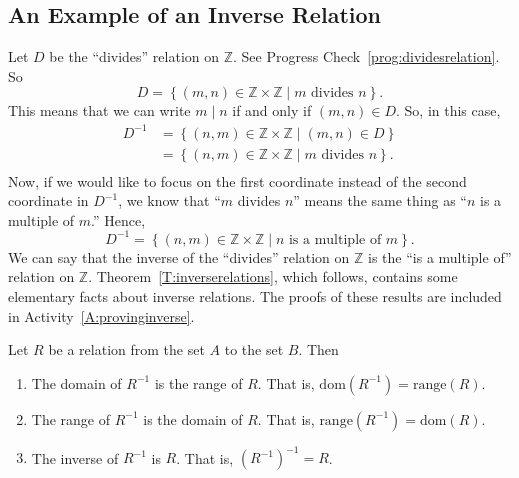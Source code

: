 \subsection*{An Example of an Inverse Relation}
Let $D$ be the ``divides'' relation on  $\mathbb{Z}$.  See Progress 
Check~\ref{prog:dividesrelation}.  So
\[
D = \left\{ { {\left( {m, n} \right) \in \mathbb{Z} \times \mathbb{Z} } \mid m\text{  divides  }n} \right\}\!.
\]
This means that we can write
$m \mid n$ if and only if $\left( {m, n} \right) \in D$.
So, in this case,
\[
\begin{aligned}
D^{ - 1}  &= \left\{ { {\left( {n, m} \right) \in \mathbb{Z} \times \mathbb{Z} } \mid \left( {m, n} \right) \in D} \right\} \\ 
          &= \left\{ { {\left( {n, m} \right) \in \mathbb{Z} \times \mathbb{Z} } \mid m\text{  divides  }n} \right\}\!. \\ 
\end{aligned}
\]
Now, if we would like to focus on the first coordinate instead of the second coordinate in  
$D^{ - 1} $, we know that  ``$m$  divides  $n$''  means the same thing as  ``$n$  is a multiple of  $m$.''  Hence,
\[
D^{ - 1}  = \left\{ { {\left( {n, m} \right) \in \mathbb{Z} \times \mathbb{Z} } \mid n\text{  is a multiple of  }m} \right\}\!.
\]
We can say that the inverse of the ``divides'' relation on  $\mathbb{Z}$  is the ``is a multiple of'' relation on  $\mathbb{Z}$.
\hbreak
%
Theorem~\ref{T:inverserelations}, which follows, contains some elementary facts about inverse relations.  The proofs of these results are included in Activity~\ref{A:provinginverse}.
%
\begin{theorem} \label{T:inverserelations}
Let  $R$  be a relation from the set  $A$  to the set  $B$.  Then

\begin{enumerate}
\item The domain of  $R^{ - 1} $ is the range of  $R$.  That is, 
$\text{dom}\!\left( {R^{ - 1} } \right) = \text{range}( R )$.  \label{T:inverserelations1}

\item The range of  $R^{ - 1} $  is the domain of  $R$.   That is, 
$\text{range}\!\left( {R^{ - 1} } \right) = \text{dom}( R )$.  \label{T:inverserelations2}

\item The inverse of  $R^{ - 1} $  is  $R$.  That is, $\left( {R^{ - 1} } \right)^{ - 1}  = R$.  \label{T:inverserelations3}

\end{enumerate}
\end{theorem}
